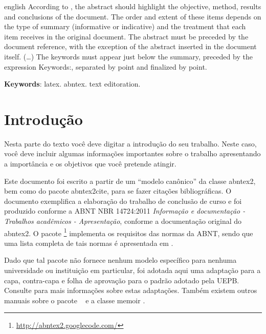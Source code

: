 \documentclass[article,12pt,oneside,a4paper,chapter=TITLE,
			   english,brazil]{abntex2}
\begin{document}
\begin{resumo}[Abstract]
	\begin{otherlanguage*}{english}
		According to , the abstract should highlight the objective, method, results and conclusions of the document. The order and extent of these items depends on the type of summary (informative or indicative) and the treatment that each item receives in the original document. The abstract must be preceded by the document reference, with the exception of the abstract inserted in the document itself. (\ldots) The keywords must appear just below the summary, preceded by the expression Keywords:, separated by point and finalized by point.
		
		\textbf{Keywords}: latex. abntex. text editoration.
	\end{otherlanguage*}
\end{resumo}
\vspace{\onelineskip}


\chapter{Introdução}
\label{introducao}

Nesta parte do texto você deve digitar a introdução do seu trabalho. Neste caso, você deve incluir algumas informações importantes sobre o trabalho apresentando a importância e os objetivos que você pretende atingir.

Este documento foi escrito a partir de um ``modelo canônico'' da classe \textsf{abntex2}, bem como do pacote \textsf{abntex2cite}, para se fazer citações bibliográficas. O documento exemplifica a elaboração do trabalho de conclusão de curso e foi produzido conforme a ABNT NBR 14724:2011 \emph{Informação e documentação - Trabalhos acadêmicos - Apresentação}, conforme a documentação original do \textsf{abntex2}. O pacote \abnTeX\footnote{\url{http://abntex2.googlecode.com/}} implementa os requisitos das normas da ABNT, sendo que uma lista completa de tais normas é apresentada em .

Dado que tal pacote não fornece nenhum modelo específico para nenhuma universidade ou instituição em particular, foi adotada aqui uma adaptação para a capa, contra-capa e folha de aprovação para o padrão adotado pela UEPB. Consulte  para mais informações sobre estas adaptações. Também existem outros manuais sobre o pacote \abnTeX\ \cite{abntex2classe,abntex2cite,abntex2cite-alf} e a classe \textsf{memoir} \cite{memoir}.
\end{document}
